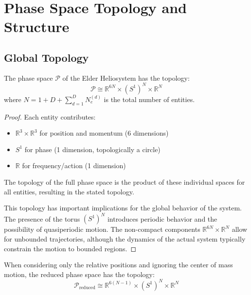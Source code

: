 \section{Phase Space Topology and Structure}

\subsection{Global Topology}

\begin{theorem}
The phase space $\mathcal{P}$ of the Elder Heliosystem has the topology:
\begin{equation}
\mathcal{P} \cong \mathbb{R}^{6N} \times (S^1)^N \times \mathbb{R}^N
\end{equation}
where $N = 1 + D + \sum_{d=1}^D N_e^{(d)}$ is the total number of entities.
\end{theorem}

\begin{proof}
Each entity contributes:
\begin{itemize}
    \item $\mathbb{R}^3 \times \mathbb{R}^3$ for position and momentum (6 dimensions)
    \item $S^1$ for phase (1 dimension, topologically a circle)
    \item $\mathbb{R}$ for frequency/action (1 dimension)
\end{itemize}

The topology of the full phase space is the product of these individual spaces for all entities, resulting in the stated topology.

This topology has important implications for the global behavior of the system. The presence of the torus $(S^1)^N$ introduces periodic behavior and the possibility of quasiperiodic motion. The non-compact components $\mathbb{R}^{6N} \times \mathbb{R}^N$ allow for unbounded trajectories, although the dynamics of the actual system typically constrain the motion to bounded regions.
\end{proof}

\begin{theorem}
When considering only the relative positions and ignoring the center of mass motion, the reduced phase space has the topology:
\begin{equation}
\mathcal{P}_{\text{reduced}} \cong \mathbb{R}^{6(N-1)} \times (S^1)^N \times \mathbb{R}^N
\end{equation}
\end{theorem}

